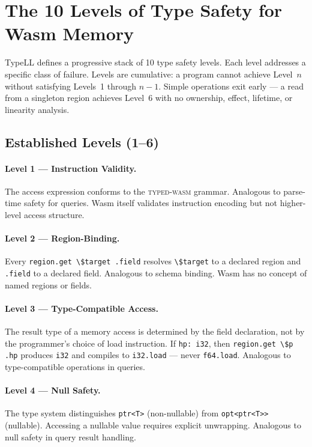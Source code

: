 \documentclass[11pt,a4paper]{article}
\newcommand{\typedwasm}{\textsc{typed-wasm}}
\begin{document}
\section{The 10 Levels of Type Safety for Wasm Memory}
\label{sec:levels}

TypeLL defines a progressive stack of 10 type safety levels.  Each level
addresses a specific class of failure.  Levels are cumulative: a program
cannot achieve Level~$n$ without satisfying Levels~1 through $n{-}1$.
Simple operations exit early --- a read from a singleton region achieves
Level~6 with no ownership, effect, lifetime, or linearity analysis.

\subsection{Established Levels (1--6)}
\label{sec:established}

\paragraph{Level 1 --- Instruction Validity.}
The access expression conforms to the \typedwasm{} grammar.  Analogous to
parse-time safety for queries.  Wasm itself validates instruction
encoding but not higher-level access structure.

\paragraph{Level 2 --- Region-Binding.}
Every \lstinline{region.get \$target .field} resolves \lstinline{\$target}
to a declared region and \lstinline{.field} to a declared field.
Analogous to schema binding.  Wasm has no concept of named regions or
fields.

\paragraph{Level 3 --- Type-Compatible Access.}
The result type of a memory access is determined by the field
declaration, not by the programmer's choice of load instruction.  If
\lstinline{hp: i32}, then \lstinline{region.get \$p .hp} produces
\lstinline{i32} and compiles to \lstinline{i32.load} --- never
\lstinline{f64.load}.  Analogous to type-compatible operations in
queries.

\paragraph{Level 4 --- Null Safety.}
The type system distinguishes \lstinline{ptr<T>} (non-nullable) from
\lstinline{opt<ptr<T>>} (nullable).  Accessing a nullable value requires
explicit unwrapping.  Analogous to null safety in query result handling.
\end{document}
